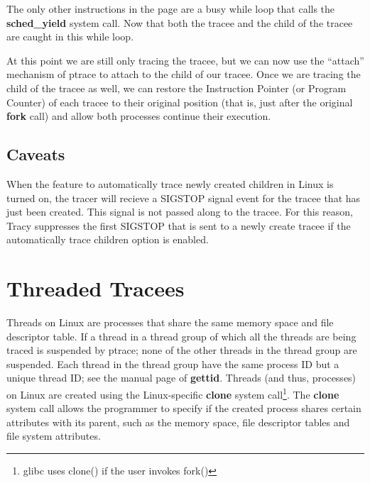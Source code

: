 \documentclass[a4paper, 10pt]{report}
\begin{document}
The only other instructions in the page are a busy while loop that
calls the \textbf{sched\_yield} system call.
Now that both the tracee and the child of the tracee are caught
in this while loop.

At this point we are still only tracing the tracee, but we can now use the
``attach'' mechanism of ptrace to attach to the child of our tracee. Once we are
tracing the child of the tracee as well, we can restore the Instruction Pointer
(or Program Counter) of each tracee to their original position
(that is, just after the original \textbf{fork} call) and allow both
processes continue their execution.



\subsection{Caveats}

When the feature to automatically trace newly created children in Linux
is turned on, the tracer will recieve a SIGSTOP signal event for the tracee
that has just been created. This signal is not passed along to the tracee.
For this reason, Tracy suppresses the first SIGSTOP that is sent
to a newly create tracee if the automatically trace children option
is enabled.

\section{Threaded Tracees}
\label{threaded-tracees}

Threads on Linux are processes that share the same memory space and file
descriptor table.
If a thread in a thread group of which all the threads are being traced
is suspended by ptrace; none of the other threads in the thread group are
suspended. Each thread in the thread group have the same process ID but a unique
thread ID; see the manual page of \textbf{gettid}.
Threads (and thus, processes) on Linux are created using the Linux-specific
\textbf{clone} system call\footnote{glibc uses clone() if the user invokes
fork()}. The \textbf{clone} system call allows the programmer to specify if the
created process shares certain attributes with its parent, such as the memory
space, file descriptor tables and file system attributes.
\end{document}
